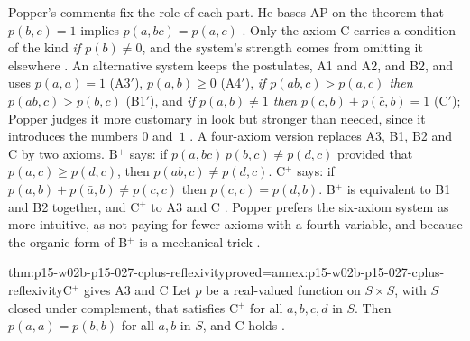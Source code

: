 Popper's comments fix the role of each part. He bases AP on the theorem
that \(p(b,c)=1\) implies \(p(a,bc)=p(a,c)\)
\parencite[appendix~*iv, note~6, p.~337]{Popper2002LogicDiscoveryUI}.
Only the axiom C carries a condition of the kind \emph{if \(p(b)\neq0\)},
and the system's strength comes from omitting it elsewhere
\parencite[appendix~*iv, p.~336]{Popper2002LogicDiscoveryUI}. An
alternative system keeps the postulates, A1 and A2, and B2, and uses
\(p(a,a)=1\) (A3\('\)), \(p(a,b)\geqslant0\) (A4\('\)), \emph{if
\(p(ab,c)>p(a,c)\) then \(p(ab,c)>p(b,c)\)} (B1\('\)), and \emph{if
\(p(a,b)\neq1\) then \(p(c,b)+p(\bar c,b)=1\)} (C\('\)); Popper judges it
more customary in look but stronger than needed, since it introduces the
numbers \(0\) and~\(1\) \parencite[appendix~*iv, note~7,
pp.~337--338]{Popper2002LogicDiscoveryUI}. A four-axiom version replaces
A3, B1, B2 and C by two axioms. B\({}^{+}\) says: if
\(p(a,bc)\,p(b,c)\neq p(d,c)\) provided that \(p(a,c)\geqslant p(d,c)\),
then \(p(ab,c)\neq p(d,c)\). C\({}^{+}\) says: if
\(p(a,b)+p(\bar a,b)\neq p(c,c)\) then \(p(c,c)=p(d,b)\). B\({}^{+}\) is equivalent to B1 and B2 together, and C\({}^{+}\) to A3 and
C \parencite[appendix~*iv, pp.~338--339]{Popper2002LogicDiscoveryUI}.
Popper prefers the six-axiom system as more intuitive, as not paying for
fewer axioms with a fourth variable, and because the organic form of
B\({}^{+}\) is a mechanical trick \parencite[appendix~*iv, note~9,
p.~339]{Popper2002LogicDiscoveryUI}.

\begin{hbtheorem}{thm:p15-w02b-p15-027-cplus-reflexivity}{proved=annex:p15-w02b-p15-027-cplus-reflexivity}{C\texorpdfstring{\({}^{+}\)}{+} gives A3 and C}
Let \(p\) be a real-valued function on \(S\times S\), with \(S\) closed
under complement, that satisfies C\({}^{+}\) for all \(a,b,c,d\) in
\(S\). Then \(p(a,a)=p(b,b)\) for all \(a,b\) in \(S\), and C holds
\parencite[appendix~*iv, note~8, p.~339]{Popper2002LogicDiscoveryUI}.
\end{hbtheorem}

